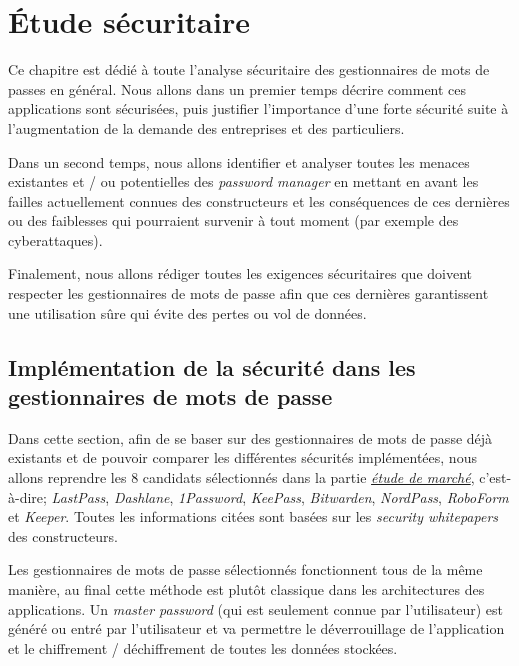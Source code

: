 
\chapter{Étude sécuritaire}
\label{ch:etude_secu}

Ce chapitre est dédié à toute l'analyse sécuritaire des gestionnaires de mots de passes en général. Nous allons dans un premier temps décrire comment ces applications sont sécurisées, puis justifier l'importance d'une forte sécurité suite à l'augmentation de la demande des entreprises et des particuliers.

Dans un second temps, nous allons identifier et analyser toutes les menaces existantes et / ou potentielles des \textit{password manager} en mettant en avant les failles actuellement connues des constructeurs et les conséquences de ces dernières ou des faiblesses qui pourraient survenir à tout moment (par exemple des cyberattaques).

Finalement, nous allons rédiger toutes les exigences sécuritaires que doivent respecter les gestionnaires de mots de passe afin que ces dernières garantissent une utilisation sûre qui évite des pertes ou vol de données.

\section{Implémentation de la sécurité dans les gestionnaires de mots de passe}

Dans cette section, afin de se baser sur des gestionnaires de mots de passe déjà existants et de pouvoir comparer les différentes sécurités implémentées, nous allons reprendre les 8 candidats sélectionnés dans la partie \hyperref[ch:etude_marche]{\textit{étude de marché}}, c'est-à-dire; \textit{LastPass}, \textit{Dashlane}, \textit{1Password}, \textit{KeePass}, \textit{Bitwarden}, \textit{NordPass}, \textit{RoboForm} et \textit{Keeper}. Toutes les informations citées sont basées sur les \textit{security whitepapers} des constructeurs\cite{lastpasssecurity}\cite{dashlanesecurity}\cite{1passwordsecurity}\cite{keepasssecurity}\cite{bitwardensecurity}.

Les gestionnaires de mots de passe sélectionnés fonctionnent tous de la même manière, au final cette méthode est plutôt classique dans les architectures des applications. Un \textit{master password} (qui est seulement connue par l'utilisateur) est généré ou entré par l'utilisateur et va permettre le déverrouillage de l'application et le chiffrement / déchiffrement de toutes les données stockées. 

